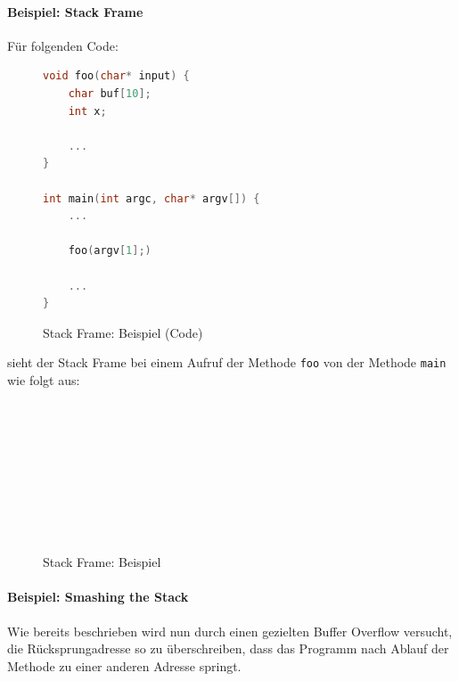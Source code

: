 \documentclass[a4paper, 11pt, accentcolor = tud3b]{tudreport}
\begin{document}
				\paragraph{Beispiel: Stack Frame}
					Für folgenden Code:
					\begin{figure}[H]
						\centering
						\begin{lstlisting}[language = C]
void foo(char* input) {
	char buf[10];
	int x;

	...
}

int main(int argc, char* argv[]) {
	...

	foo(argv[1];)

	...
}
\end{lstlisting}
						\caption{Stack Frame: Beispiel (Code)}
					\end{figure}
					sieht der Stack Frame bei einem Aufruf der Methode \lstinline[language = C]|foo| von der Methode \lstinline[language = C]|main| wie folgt aus:
					\begin{figure}[H]
						\centering
						\begin{bytefield}{16}
							 \\
							 \\
							 \\
							 \\
							 \\
							 \\
							 \\
							\skippedwords \\
						\end{bytefield}
						\caption{Stack Frame: Beispiel}
					\end{figure}

	            \paragraph{Beispiel: Smashing the Stack}
	                Wie bereits beschrieben wird nun durch einen gezielten Buffer Overflow versucht, die Rücksprungadresse so zu überschreiben, dass das Programm nach Ablauf der Methode zu einer anderen Adresse springt.
	                
\end{document}
